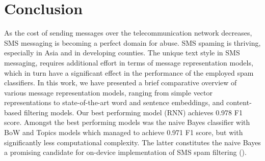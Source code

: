 \documentclass[letterpaper]{article}
\begin{document}
\section{Conclusion} \label{Conclusion}

As the cost of sending messages over the telecommunication network decreases, SMS messaging is becoming a perfect domain for abuse. SMS spaming is thriving, especially in Asia and in developing counties. The unique text style in SMS messaging, requires additional effort in terms of message representation models, which in turn have a significant effect in the performance of the employed spam classifiers. In this work, we have presented a brief comparative overview of various message representation models, ranging from simple vector representations to state-of-the-art word and sentence embeddings, and content-based filtering models. Our best performing model (RNN) achieves 0.978 F1 score. Amongst the best performing models was the naive Bayes classifier with BoW and Topics models which managed to achieve 0.971 F1 score, but with significantly less computational complexity. The latter constitutes the naive Bayes a promising candidate for on-device implementation of SMS spam filtering (\cite{chan1982updating}).
\end{document}
